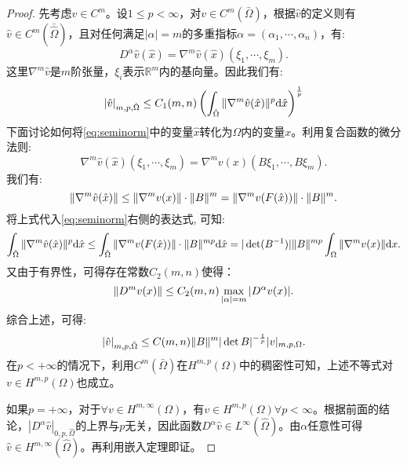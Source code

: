 \begin{proof}
    先考虑$v\in C^{m}$。设$1\le p<\infty$，对$v\in C^{m}(\bar{\Omega})$，根据$\hat{v}$的定义则有$\hat{v}\in C^{m}(\bar{\hat{\Omega}})$，且对任何满足$|\alpha|=m$的多重指标$\alpha=(\alpha_{1},\cdots,\alpha_{n})$，有:
    \begin{equation}
        D^{\alpha}\hat{v}(\hat{x})=\nabla^{m}\hat{v}(\hat{x})(\xi_{1},\cdots,\xi_{m}).
    \end{equation}
    这里$\nabla^{m}\hat{v}$是$m$阶张量，$\xi_{i}$表示$\mathbb{R}^{m}$内的基向量。因此我们有:
    \begin{equation}
        \label{eq:seminorm}
        |\hat{v}|_{m,p,\hat{\Omega}}\le C_{1}(m,n)\left(\int_{\hat{\Omega}}\|\nabla^{m}\hat{v}(\hat{x})\|^{p}\mathrm{d}\hat{x}\right)^{\frac{1}{p}}
    \end{equation}
    下面讨论如何将\eqref{eq:seminorm}中的变量$\hat{x}$转化为$\Omega$内的变量$x$。利用复合函数的微分法则:
    \begin{equation}
        \nabla^{m}\hat{v}(\hat{x})(\xi_{1},\cdots,\xi_{m})=\nabla^{m}v(x)(B\xi_{1},\cdots,B\xi_{m}).
    \end{equation}
    我们有:
    \begin{equation}
        \|\nabla^{m}\hat{v}(\hat{x})\|\le\|\nabla^{m}v(x)\|\cdot\|B\|^{m}=\|\nabla^{m}v(F(\hat{x}))\|\cdot\|B\|^{m}.
    \end{equation}
    将上式代入\eqref{eq:seminorm}右侧的表达式, 可知:
    \begin{equation}
        \int_{\hat{\Omega}}\|\nabla^{m}\hat{v}(\hat{x})\|^{p}\mathrm{d}\hat{x}\le\int_{\hat{\Omega}}\|\nabla^{m}v(F(\hat{x}))\|\cdot \|B\|^{mp}\mathrm{d}\hat{x}=|\det(B^{-1})|\|B\|^{mp}\int_{\Omega}\|\nabla^{m}v(x)\|\mathrm{d} x.
    \end{equation}
    又由于有界性，可得存在常数$C_{2}(m,n)$使得：
    \begin{equation}
        \|D^{m}v(x)\|\le C_{2}(m,n)\max_{|\alpha|=m}|D^{\alpha}v(x)|.
    \end{equation}
    综合上述，可得:
    \begin{equation}
        |\hat{v}|_{m,p,\hat{\Omega}}\le C(m,n)\|B\|^{m}|\det B|^{-\frac{1}{p}}|v|_{m,p,\Omega}.
    \end{equation}
    在$p<+\infty$的情况下，利用$C^{m}(\bar{\Omega})$在$H^{m,p}(\Omega)$中的稠密性可知，上述不等式对$v\in H^{m,p}(\Omega)$也成立。

    如果$p=+\infty$，对于$\forall v\in H^{m,\infty}(\Omega)$，有$v\in H^{m,p}(\Omega)\forall p<\infty$。根据前面的结论，$|D^{\alpha}\hat{v}|_{0,p,\hat{\Omega}}$的上界与$p$无关，因此函数$D^{\alpha}\hat{v}\in L^{\infty}(\hat{\Omega})$。由$\alpha$任意性可得$\hat{v}\in H^{m,\infty}(\hat{\Omega})$。再利用嵌入定理即证。
\end{proof}
